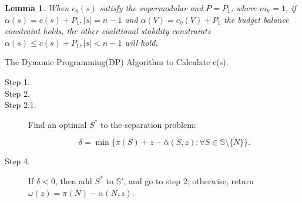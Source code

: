 \documentclass[UTF8]{article}
\newtheorem{lem}{\hspace{2em}Lemma}
\begin{document}
\begin{lem}\label{lem4}
When $c_0(s)$ satisfy the supermodular and $P=P_1$, where $m_V=1$, if $\alpha(s)=c(s)+P_1, \left| s \right|= n-1$ and $\alpha(V)=c_0(V)+P_1$ the budget balance constraint holds, the other coalitional stability constraints $\alpha(s) \leq c(s)+P_1, \left| s \right| < n-1$ will hold.
\end{lem}





\begin{algorithm}[h]\label{algoDP}
\caption{The Dynamic Programming(DP) Algorithm to Calculate c(s).}
\begin{algorithmic}[1]

\begin{description}
  \item[Step 1.]
  \item[Step 2.]

  \qquad \item[Step 2.1.] Find an optimal $S^*$ to the separation problem:

  \begin{equation*}
  \delta = \min \big\{ \pi(S)+z-\bar{\alpha}(S,z): \forall S \in \mathbb{S} \setminus \{N\}\big\}.
  \end{equation*}

  \item[Step 4.]
  If $\delta<0$, then add $S^*$ to $\mathbb{S}'$, and go to step 2; otherwise, return $\omega(z)=\pi(N)-\bar{\alpha}(N,z)$.

\end{description}

\end{algorithmic}
\end{algorithm}
\end{document}
